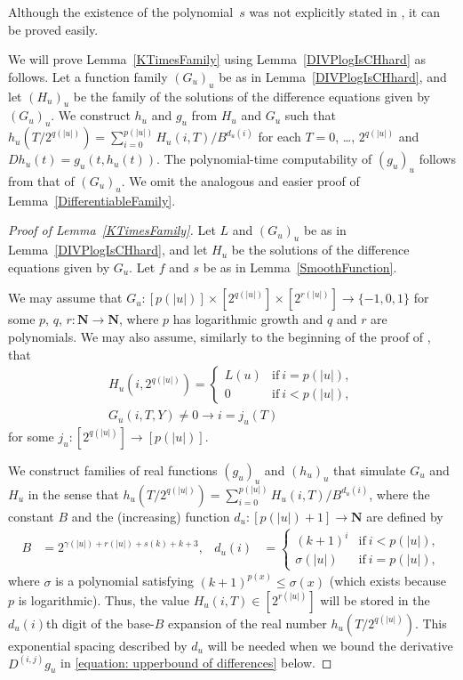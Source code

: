 \documentclass{lmcs}
\theoremstyle{definition}
\theoremstyle{remark}
\newcommand{\N}{\mathbf N}
\newcommand{\D}{D}
\begin{document}
Although the existence of the polynomial~$s$ 
was not explicitly stated in \cite[Lemma 3.6]{ko1991complexity},
it can be proved easily.

We will prove Lemma~\ref{KTimesFamily} using Lemma~\ref{DIVPlogIsCHhard} as follows.
Let a function family $(G_u)_u$ be as in Lemma~\ref{DIVPlogIsCHhard},
and let $(H_u)_u$ be the family of the solutions of the difference equations given by $(G_u)_u$.
We construct $h_u$ and $g_u$ from $H_u$ and $G_u$ 
such that $h_u(T/2^{q(|u|)}) = \sum^{p(|u|)}_{i = 0} H_u(i, T)/B^{d_u(i)}$ for each $T = 0$, \ldots, $2^{q(|u|)}$
and $\D h_u(t) = g_u(t, h_u(t))$.
The polynomial-time computability of $(g_u)_u$ follows from that of $(G_u)_u$.
We omit the analogous and easier proof of Lemma~\ref{DifferentiableFamily}.

\begin{proof}[Proof of Lemma~\ref{KTimesFamily}]
Let $L$ and $(G_u)_u$ be as in Lemma~\ref{DIVPlogIsCHhard},
and let $H_u$ be the solutions of 
the difference equations given by $G_u$.
Let $f$ and $s$ be as in Lemma~\ref{SmoothFunction}.

We may assume that 
$G_u \colon [p(|u|)] \times [2^{q(|u|)}] \times [2^{r(|u|)}] \to \{-1, 0, 1\}$
for some $p$, $q$, $r \colon \N \to \N$, 
where $p$ has logarithmic growth and $q$ and $r$ are polynomials. 
We may also assume, similarly to the beginning of the proof of \cite[Lemma 4.1]{kawamura2010lipschitz},
that 
\begin{gather}
 H_u(i, 2^{q(|u|)}) = \begin{cases}
		       L(u) & \text{if} \ i=p(|u|), \\
		       0 & \text{if} \ i<p(|u|), 
		      \end{cases}
\\
 G_u(i, T, Y) \neq 0 \to i = j_u(T)
\end{gather}
for some $
j _u \colon [2 ^{q (\lvert u \rvert)}] \to [p (\lvert u \rvert)]
$. 

We construct families of real functions $(g_u)_u$ and $(h_u)_u$ 
that simulate $G _u$ and $H _u$ 
in the sense that $h_u(T/2^{q(|u|)}) = \sum^{p(|u|)}_{i = 0}H_u(i, T)/B^{d_u(i)}$, 
where the constant $B$ and the 
(increasing) function $d_u \colon [p(|u|)+1] \to \N$ are 
defined by
  \begin{align}
   \label{eq:positioning}
   B &= 2^{\gamma(|u|) + r(|u|) + s(k) + k + 3}, 
   &
   d_u(i) &= 
   \begin{cases}
    (k+1)^i & \text{if} \ i<p(|u|), 
    \\
    \sigma(|u|) & \text{if} \ i=p(|u|), 
   \end{cases}
  \end{align}
where $\sigma$ is a polynomial satisfying $(k+1)^{p(x)} \le \sigma(x)$
(which exists because $p$ is logarithmic). 
Thus, the value $H _u (i, T) \in [2 ^{r (\lvert u \rvert)}]$ will be stored 
in the $d _u (i)$th digit of the base-$B$ expansion of 
the real number $h _u (T / 2 ^{q (\lvert u \rvert)})$. 
This exponential spacing described by $d _u$ will be needed
when we bound the derivative $\D ^{(i, j)} g _u$ 
in \eqref{equation: upperbound of differences} below. 


\end{proof}
\end{document}
